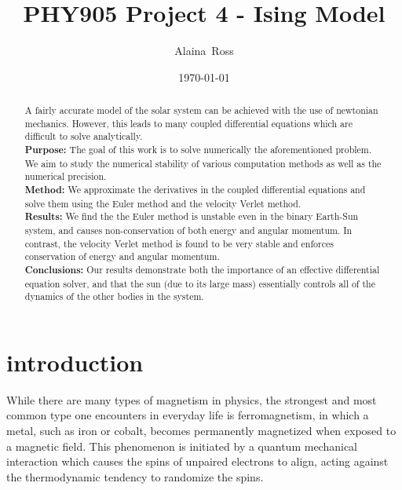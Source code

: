 \documentclass[prc,amsmath,twocolumn,superscriptaddress]{revtex4}
\begin{document}
  \newcommand {\nc} {\newcommand}
  \nc {\Sec} [1] {Sec.~\ref{#1}}
  \nc {\IR} [1] {\textcolor{red}{#1}} 

\title{PHY905 Project 4 - Ising Model}


\author{Alaina~Ross}

\date{\today}


\begin{abstract}
  A fairly accurate model of the solar system can be achieved with the use of newtonian mechanics. However, this leads to many coupled differential equations which are difficult to solve analytically.
\\ {\bf Purpose:} The goal of this work is to solve numerically the aforementioned problem. We aim to study the numerical stability of various computation methods as well as the numerical precision.
\\ {\bf Method:} We approximate the derivatives in the coupled differential equations and solve them using the Euler method and the velocity Verlet method.
\\ {\bf Results:} We find the the Euler method is unstable even in the binary Earth-Sun system, and causes non-conservation of both energy and angular momentum. In contrast, the velocity Verlet method is found to be very stable and enforces conservation of energy and angular momentum.
 \\ {\bf Conclusions:} Our results demonstrate both the importance of an effective differential equation solver, and that the sun (due to its large mass) essentially controls all of the dynamics of the other bodies in the system. 
\end{abstract}


\maketitle

\section{introduction}
\label{intro}
While there are many types of magnetism in physics, the strongest and most common type one encounters in everyday life is ferromagnetism, in which a metal, such as iron or cobalt, becomes permanently magnetized when exposed to a magnetic field. This phenomenon is initiated by a quantum mechanical interaction which causes the spins of unpaired electrons to align, acting against the thermodynamic tendency to randomize the spins.
\end{document}
